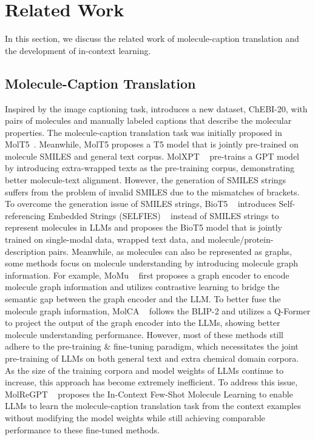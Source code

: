 \section{Related Work}
\label{sec:relatedwork}
In this section, we discuss the related work of molecule-caption translation and the development of in-context learning.

\subsection{Molecule-Caption Translation}
Inspired by the image captioning task, \citet{edwards2021text2mol} introduces a new dataset, ChEBI-20, with pairs of molecules and manually labeled captions that describe the molecular properties. The molecule-caption translation task was initially proposed in MolT5~\cite{edwards-etal-2022-translation}. Meanwhile, MolT5 proposes a T5 model that is jointly pre-trained on molecule SMILES and general text corpus.
MolXPT ~\cite{liu2023molxpt} pre-trains a GPT model by introducing extra-wrapped texts as the pre-training corpus, demonstrating better molecule-text alignment.
However, the generation of SMILES strings suffers from the problem of invalid SMILES due to the mismatches of brackets.
To overcome the generation issue of SMILES strings, BioT5 ~\cite{pei2023biot5} introduces Self-referencing Embedded Strings (SELFIES) ~\cite{krenn2020self} instead of SMILES strings to represent molecules in LLMs and proposes the BioT5 model that is jointly trained on single-modal data, wrapped text data, and molecule/protein-description pairs.
Meanwhile, as molecules can also be represented as graphs, some methods focus on molecule understanding by introducing molecule graph information.
For example, MoMu ~\cite{su2022molecular} first proposes a graph encoder to encode molecule graph information and utilizes contrastive learning to bridge the semantic gap between the graph encoder and the LLM.
To better fuse the molecule graph information, MolCA ~\cite{liu2023molca} follows the BLIP-2 and utilizes a Q-Former to project the output of the graph encoder into the LLMs, showing better molecule understanding performance.
However, most of these methods still adhere to the pre-training \& fine-tuning paradigm, which necessitates the joint pre-training of LLMs on both general text and extra chemical domain corpora. As the size of the training corpora and model weights of LLMs continue to increase, this approach has become extremely inefficient.
To address this issue, MolReGPT ~\cite{li2023empowering} proposes the In-Context Few-Shot Molecule Learning to enable LLMs to learn the molecule-caption translation task from the context examples without modifying the model weights while still achieving comparable performance to these fine-tuned methods.

